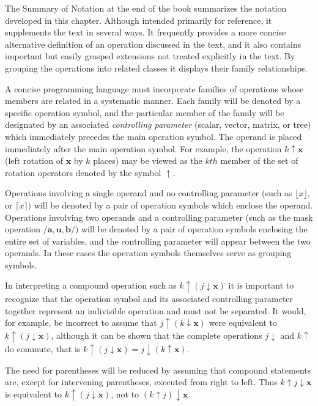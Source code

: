 \par The Summary of Notation at the end of the book summarizes the notation developed in this chapter. Although intended primarily for reference, it supplements the text in several ways. It frequently provides a more concise alternative definition of an operation discussed in the text, and it also contains important but easily grasped extensions not treated explicitly in the text. By grouping the operations into related classes it displays their family relationships.

\par A concise programming language must incorporate families of operations whose members are related in a systematic manner. Each family will be denoted by a specific operation symbol, and the particular member of the family will be designated by an associated \textit{controlling parameter} (scalar, vector, matrix, or tree) which immediately precedes the main operation symbol. The operand is placed immediately after the main operation symbol. For example, the operation $k ↑ \mathbf{x}$ (left rotation of $\mathbf{x}$ by $k$ places) may be viewed as the $kth$ member of the set of rotation operators denoted by the symbol $↑$.

\par Operations involving a single operand and no controlling parameter (such as $⌊x⌋$, or $⌈x⌉)$ will be denoted by a pair of operation symbols which enclose the operand. Operations involving two operands and a controlling parameter (such as the mask operation $/\mathbf{a}, \mathbf{u}, \mathbf{b}/)$ will be denoted by a pair of operation symbols enclosing the entire set of variables, and the controlling parameter will appear between the two operands. In these cases the operation symbols themselves serve as grouping symbols.

\par In interpreting a compound operation such as $k ↑ (j ↓ \mathbf{x})$ it is important to recognize that the operation symbol and its associated controlling parameter together represent an indivisible operation and must not be separated. It would, for example, be incorrect to assume that $j ↑ (k ↓ \mathbf{x})$ were equivalent to $k ↑ (j ↓ \mathbf{x})$, although it can be shown that the complete operations $j ↓$ and $k ↑$ do commute, that is $k ↑ (j ↓ \mathbf{x}) = j ↓ (k ↑ \mathbf{x})$.

\par The need for parentheses will be reduced by assuming that compound statements are, except for intervening parentheses, executed from right to left. Thus $k ↑ j ↓ \mathbf{x}$ is equivalent to $k ↑ (j ↓ \mathbf{x})$, not to $(k ↑ j) ↓ \mathbf{x}$.

